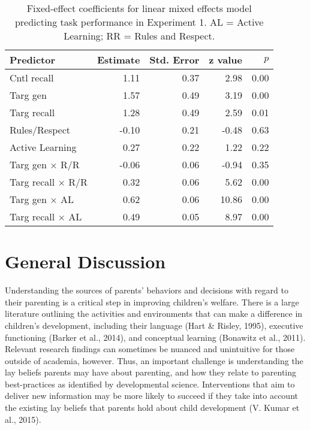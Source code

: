 \documentclass[10pt, letterpaper]{article}
\begin{document}
\begin{table}[t]
\centering
\begin{tabular}{lrrrr}
  \hline
Predictor & Estimate & Std. Error & z value & $p$ \\ 
  \hline
  Cntl recall & 1.11 & 0.37 & 2.98 & 0.00 \\ 
  Targ gen & 1.57 & 0.49 & 3.19 & 0.00 \\ 
  Targ recall & 1.28 & 0.49 & 2.59 & 0.01 \\ 
  Rules/Respect & -0.10 & 0.21 & -0.48 & 0.63 \\ 
  Active Learning & 0.27 & 0.22 & 1.22 & 0.22 \\ 
  Targ gen $\times$ R/R & -0.06 & 0.06 & -0.94 & 0.35 \\ 
  Targ recall $\times$ R/R& 0.32 & 0.06 & 5.62 & 0.00 \\ 
  Targ gen $\times$ AL & 0.62 & 0.06 & 10.86 & 0.00 \\ 
  Targ recall $\times$ AL & 0.49 & 0.05 & 8.97 & 0.00 \\ 
   \hline
\end{tabular}
\caption{Fixed-effect coefficients for linear mixed effects model predicting task performance in Experiment 1. AL = Active Learning; RR = Rules and Respect.\label{tab:lmer}} 
\end{table}

\section{General Discussion}\label{general-discussion}

Understanding the sources of parents' behaviors and decisions with
regard to their parenting is a critical step in improving children's
welfare. There is a large literature outlining the activities and
environments that can make a difference in children's development,
including their language (Hart \& Risley, 1995), executive functioning
(Barker et al., 2014), and conceptual learning (Bonawitz et al., 2011).
Relevant research findings can sometimes be nuanced and unintuitive for
those outside of academia, however. Thus, an important challenge is
understanding the lay beliefs parents may have about parenting, and how
they relate to parenting best-practices as identified by developmental
science. Interventions that aim to deliver new information may be more
likely to succeed if they take into account the existing lay beliefs
that parents hold about child development (V. Kumar et al., 2015).
\end{document}
